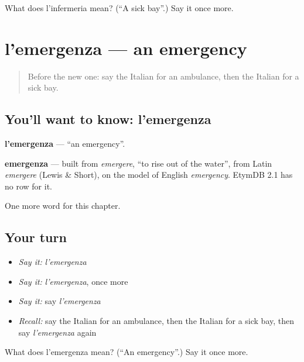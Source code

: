 \begin{tcolorbox}[breakable,colback=teal!4,colframe=teal!35!black,title={Before you move on}]
What does l'infermeria mean? (\textquotedblleft{}A sick bay\textquotedblright{}.) Say it once more.
\end{tcolorbox}
\section[l'emergenza]{l'emergenza — an emergency}

\label{lesson:IT-C243-emergenza}



\begin{quote}
Before the new one: say the Italian for an ambulance, then the Italian for a sick bay.
\end{quote}

\subsection*{You'll want to know: l'emergenza}
\textbf{l'emergenza} — \textquotedblleft{}an emergency\textquotedblright{}.

\begin{cousinweb}
\textbf{emergenza} — built from \emph{emergere}, \textquotedblleft{}to rise out of the water\textquotedblright{}, from Latin \emph{emergere} (Lewis \& Short), on the model of English \emph{emergency}. EtymDB 2.1 has no row for it.
\end{cousinweb}

\begin{grammarlens}[title={What you've built}]
One more word for this chapter.
\end{grammarlens}

\subsection*{Your turn}
\begin{itemize}
\raggedright
  \item \emph{Say it:} \emph{l'emergenza}
  \item \emph{Say it:} \emph{l'emergenza}, once more
  \item \emph{Say it:} say \emph{l'emergenza}
  \item \emph{Recall:} say the Italian for an ambulance, then the Italian for a sick bay, then say \emph{l'emergenza} again
\end{itemize}

\begin{tcolorbox}[breakable,colback=teal!4,colframe=teal!35!black,title={Before you move on}]
What does l'emergenza mean? (\textquotedblleft{}An emergency\textquotedblright{}.) Say it once more.
\end{tcolorbox}

